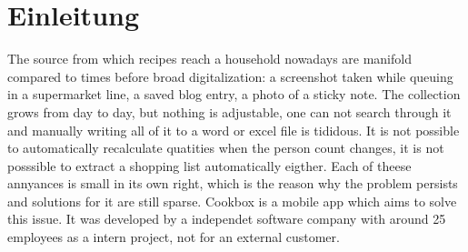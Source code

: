 %
%
%
%

\section{Einleitung}


The source from which recipes reach a household nowadays are manifold compared to times before broad digitalization: a screenshot taken while queuing in a supermarket line, a saved blog entry, a photo of a sticky note. The collection grows from day to day, but nothing is adjustable, one can not search through it and manually writing all of it to a word or excel file is tididous. It is not possible to automatically recalculate quatities when the person count changes, it is not posssible to extract a shopping list automatically eigther. Each of theese annyances is small in its own right, which is the reason why the problem persists and solutions for it are still sparse. Cookbox is a mobile app which aims to solve this issue. It was developed by a independet software company with around 25 employees as a intern project, not for an external customer. 

